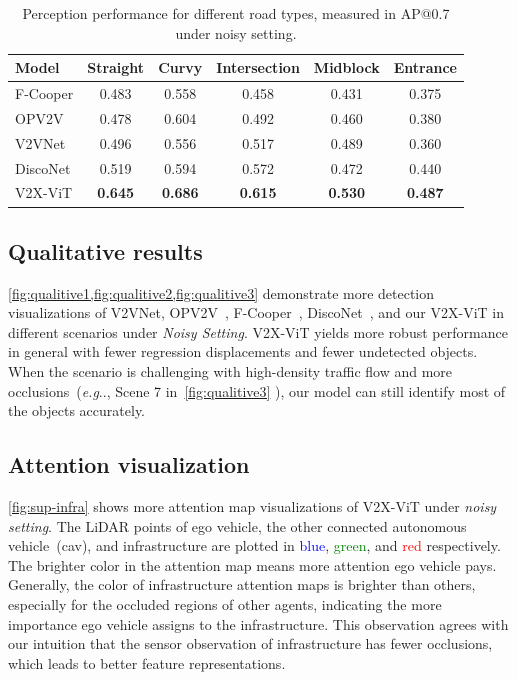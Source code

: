 \documentclass[runningheads]{llncs}
\makeatletter
\DeclareRobustCommand\onedot{\futurelet\@let@token\@onedot}
\def\@onedot{\ifx\@let@token.\else.\null\fi\xspace}
\def\eg{\emph{e.g}\onedot} \def\Eg{\emph{E.g}\onedot}
\makeatother
\begin{document}
\begin{table}[!htb]
\centering
\footnotesize
\setlength{\tabcolsep}{8pt}
\renewcommand\thetable{T4}
\caption{Perception performance for different road types, measured in AP@0.7 under noisy setting.}
\label{tbl:road-types}
\begin{tabular}{l|c|c|c|c|c}
  \cellcolor{lightgray}  Model &  \cellcolor{lightgray}  Straight &  \cellcolor{lightgray}  Curvy &  \cellcolor{lightgray}  Intersection &  \cellcolor{lightgray}  Midblock &  \cellcolor{lightgray}  Entrance    \\ \toprule 
 F-Cooper  & 0.483 &	0.558 &	0.458 &	0.431 &	0.375 \\
 OPV2V   & 0.478	 & 0.604	 & 0.492	 & 0.460  &	0.380 \\
 V2VNet  & 0.496 &	0.556 &	0.517 &	0.489 &	0.360\\ 
DiscoNet  & 0.519 &	0.594 &	0.572 &	0.472 &	0.440\\
 V2X-ViT   & \textbf{0.645}&	\textbf{0.686} &	\textbf{0.615} &	\textbf{0.530} &	\textbf{0.487}  \\  \bottomrule
\end{tabular}
\end{table}

\subsection{Qualitative results}

\sloppy
\cref{fig:qualitive1,fig:qualitive2,fig:qualitive3} demonstrate more detection visualizations of V2VNet\cite{wang2020v2vnet}, OPV2V~\cite{xu2021opv2v}, F-Cooper~\cite{chen2019f}, DiscoNet~\cite{li2021learning}, and our  V2X-ViT in different scenarios under \textit{Noisy Setting}.  V2X-ViT yields more robust performance in general with fewer regression displacements and fewer undetected objects. When the scenario is challenging with high-density traffic flow and more occlusions~(\eg, Scene 7 in~\cref{fig:qualitive3} ), our model can still identify most of the objects accurately.

\subsection{Attention visualization}
\cref{fig:sup-infra} shows more attention map visualizations of V2X-ViT under \textit{noisy setting}. The LiDAR points of ego vehicle, the other connected autonomous vehicle~(cav), and infrastructure are plotted in \textcolor{blue}{blue}, \textcolor{green}{green}, and \textcolor{red}{red} respectively. The brighter color in the attention map means more attention ego vehicle pays. Generally, the color of infrastructure attention maps is brighter than others, especially for the occluded regions of other agents, indicating the more importance ego vehicle assigns to the infrastructure. This observation agrees with our intuition that the sensor observation of infrastructure has fewer occlusions, which leads to better feature representations.
\end{document}
